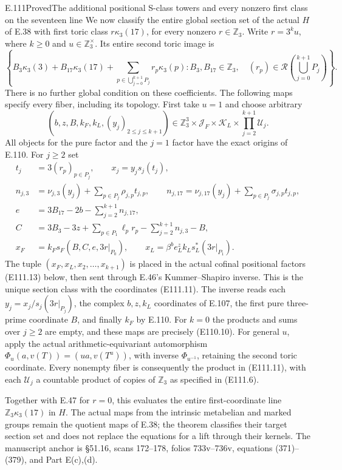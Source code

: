 \begin{statement}{E.111}{Proved}{The additional positional S-class towers and every nonzero first class on the seventeen line}
We now classify the entire global section set of the actual
$H$ of E.38 with first toric class $r\kappa_3(17)$, for
every nonzero $r\in\mathbb Z_3$. Write $r=3^k u$, where
$k\ge0$ and $u\in\mathbb Z_3^\times$. Its entire second
toric image is
\[
 \left\{B_3\kappa_3(3)+B_{17}\kappa_3(17)
       +\sum_{p\in\bigcup_{j=0}^{k+1}P_j}r_p\kappa_3(p):
       B_3,B_{17}\in\mathbb Z_3,\quad
       (r_p)\in\mathcal R\!\left(\bigcup_{j=0}^{k+1}P_j\right)
       \right\}.
 \tag{E111.10}
\]
There is no further global condition on these coefficients.
The following maps specify every fiber, including its
topology. First take $u=1$ and choose arbitrary
\[
 (b,z,B,k_F,k_L,(y_j)_{2\le j\le k+1})
 \in\mathbb Z_3^3\times\mathcal J_F\times\mathcal K_L
                              \times\prod_{j=2}^{k+1}\mathcal U_j.
 \tag{E111.11}
\]
All objects for the pure factor and the $j=1$ factor have
the exact origins of E.110. For $j\ge2$ set
\[
 \begin{split}
 t_j&=3(r_p)_{p\in P_j},\qquad x_j=y_j s_j(t_j),\\
 n_{j,3}&=\nu_{j,3}(y_j)+\sum_{p\in P_j}\rho_{j,p}t_{j,p},\qquad
 n_{j,17}=\nu_{j,17}(y_j)+\sum_{p\in P_j}\sigma_{j,p}t_{j,p},\\
 e&=3B_{17}-2b-\sum_{j=2}^{k+1}n_{j,17},\\
 C&=3B_3-3z+\sum_{p\in P_1}\ell_p r_p
                  -\sum_{j=2}^{k+1}n_{j,3}-B,\\
 x_F&=k_Fs_F(B,C,e,3r|_{P_0}),\qquad
 x_L=\beta^b e_L^z k_Ls_L^*(3r|_{P_1}).
 \end{split}
 \tag{E111.12}
\]
The tuple $(x_F,x_L,x_2,\ldots,x_{k+1})$ is placed in the
actual cofinal positional factors (E111.13) below, then
sent through E.46's Kummer--Shapiro inverse. This is the
unique section class with the coordinates (E111.11).
The inverse reads each $y_j=x_j/s_j(3r|_{P_j})$, the
complex $b,z,k_L$ coordinates of E.107, the first pure
three-prime coordinate $B$, and finally $k_F$ by E.110.
For $k=0$ the products and sums over $j\ge2$ are empty,
and these maps are precisely (E110.10).
For general $u$, apply the actual arithmetic-equivariant
automorphism $\Phi_u(a,v(T))=(ua,v(T^u))$, with inverse
$\Phi_{u^{-1}}$, retaining the second toric coordinate.
Every nonempty fiber is consequently the product in
(E111.11), with each $\mathcal U_j$ a countable product
of copies of $\mathbb Z_3$ as specified in (E111.6).

Together with E.47 for $r=0$, this evaluates the entire
first-coordinate line $\mathbb Z_3\kappa_3(17)$ in $H$.
The actual maps from the intrinsic metabelian and marked
groups remain the quotient maps of E.38; the theorem
classifies their target section set and does not replace
the equations for a lift through their kernels.
The manuscript anchor is \S51.16, scans 172--178,
folios 733v--736v, equations (371)--(379), and Part E(c),(d).
\end{statement}

